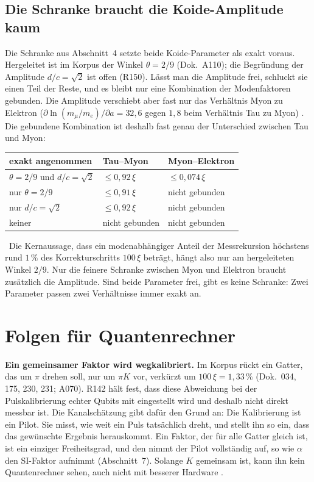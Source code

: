 \subsection{Die Schranke braucht die Koide-Amplitude kaum}

Die Schranke aus Abschnitt~4 setzte beide Koide-Parameter als exakt voraus. Hergeleitet ist im Korpus
der Winkel $\theta=2/9$ (Dok.~A110); die Begründung der Amplitude $d/c=\sqrt2$ ist offen (R150). Lässt man
die Amplitude frei, schluckt sie einen Teil der Reste, und es bleibt nur eine Kombination der
Modenfaktoren gebunden. Die Amplitude verschiebt aber fast nur das Verhältnis Myon zu Elektron
($\partial\ln(m_\mu/m_e)/\partial a=32{,}6$ gegen $1{,}8$ beim Verhältnis Tau zu Myon) \KM. Die gebundene
Kombination ist deshalb fast genau der Unterschied zwischen Tau und Myon:

\begin{center}
\begin{tabular}{@{}lll@{}}
\toprule
\textbf{exakt angenommen} & \textbf{Tau--Myon} & \textbf{Myon--Elektron}\\
\midrule
$\theta=2/9$ und $d/c=\sqrt2$ & $\le0{,}92\,\xi$ & $\le0{,}074\,\xi$\\
nur $\theta=2/9$ & $\le0{,}91\,\xi$ & nicht gebunden\\
nur $d/c=\sqrt2$ & $\le0{,}92\,\xi$ & nicht gebunden\\
keiner & nicht gebunden & nicht gebunden\\
\bottomrule
\end{tabular}
\end{center}
\KM\ Die Kernaussage, dass ein modenabhängiger Anteil der Messrekursion höchstens rund $1\,\%$ des
Korrekturschritts $100\,\xi$ beträgt, hängt also nur am hergeleiteten Winkel $2/9$. Nur die feinere
Schranke zwischen Myon und Elektron braucht zusätzlich die Amplitude. Sind beide Parameter frei, gibt es
keine Schranke: Zwei Parameter passen zwei Verhältnisse immer exakt an.

\section{Folgen für Quantenrechner}

\textbf{Ein gemeinsamer Faktor wird wegkalibriert.} Im Korpus rückt ein Gatter, das um $\pi$
drehen soll, nur um $\pi K$ vor, verkürzt um $100\,\xi=1{,}33\,\%$ (Dok.~034, 175, 230, 231; A070).
R142 hält fest, dass diese Abweichung bei der Pulskalibrierung echter Qubits mit eingestellt wird und
deshalb nicht direkt messbar ist. Die Kanalschätzung gibt dafür den Grund an: Die Kalibrierung ist ein
Pilot. Sie misst, wie weit ein Puls tatsächlich dreht, und stellt ihn so ein, dass das gewünschte
Ergebnis herauskommt. Ein Faktor, der für alle Gatter gleich ist, ist ein einziger Freiheitsgrad, und
den nimmt der Pilot vollständig auf, so wie $\alpha$ den SI-Faktor aufnimmt (Abschnitt~7). Solange $K$
gemeinsam ist, kann ihn kein Quantenrechner sehen, auch nicht mit besserer Hardware \BM.

